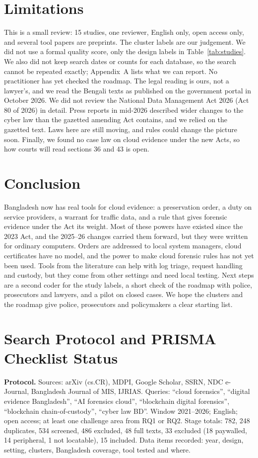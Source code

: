 \documentclass[conference]{IEEEtran}
\begin{document}
\section{Limitations}
This is a small review: 15 studies, one reviewer, English only, open access only, and several tool papers are preprints. The cluster labels are our judgement. We did not use a formal quality score, only the design labels in Table~\ref{tab:studies}. We also did not keep search dates or counts for each database, so the search cannot be repeated exactly; Appendix~A lists what we can report. No practitioner has yet checked the roadmap. The legal reading is ours, not a lawyer's, and we read the Bengali texts as published on the government portal in October 2026. We did not review the National Data Management Act 2026 (Act 80 of 2026) in detail. Press reports in mid-2026 described wider changes to the cyber law than the gazetted amending Act contains, and we relied on the gazetted text. Laws here are still moving, and rules could change the picture soon. Finally, we found no case law on cloud evidence under the new Acts, so how courts will read sections 36 and 43 is open.

\section{Conclusion}
Bangladesh now has real tools for cloud evidence: a preservation order, a duty on service providers, a warrant for traffic data, and a rule that gives forensic evidence under the Act its weight. Most of these powers have existed since the 2023 Act, and the 2025--26 changes carried them forward, but they were written for ordinary computers. Orders are addressed to local system managers, cloud certificates have no model, and the power to make cloud forensic rules has not yet been used. Tools from the literature can help with log triage, request handling and custody, but they come from other settings and need local testing. Next steps are a second coder for the study labels, a short check of the roadmap with police, prosecutors and lawyers, and a pilot on closed cases. We hope the clusters and the roadmap give police, prosecutors and policymakers a clear starting list.

\appendices
\section{Search Protocol and PRISMA Checklist Status}
\textbf{Protocol.} Sources: arXiv (cs.CR), MDPI, Google Scholar, SSRN, NDC e-Journal, Bangladesh Journal of MIS, IJRIAS. Queries: ``cloud forensics'', ``digital evidence Bangladesh'', ``AI forensics cloud'', ``blockchain digital forensics'', ``blockchain chain-of-custody'', ``cyber law BD''. Window 2021--2026; English; open access; at least one challenge area from RQ1 or RQ2. Stage totals: 782, 248 duplicates, 534 screened, 486 excluded, 48 full texts, 33 excluded (18 paywalled, 14 peripheral, 1 not locatable), 15 included. Data items recorded: year, design, setting, clusters, Bangladesh coverage, tool tested and where.
\end{document}
